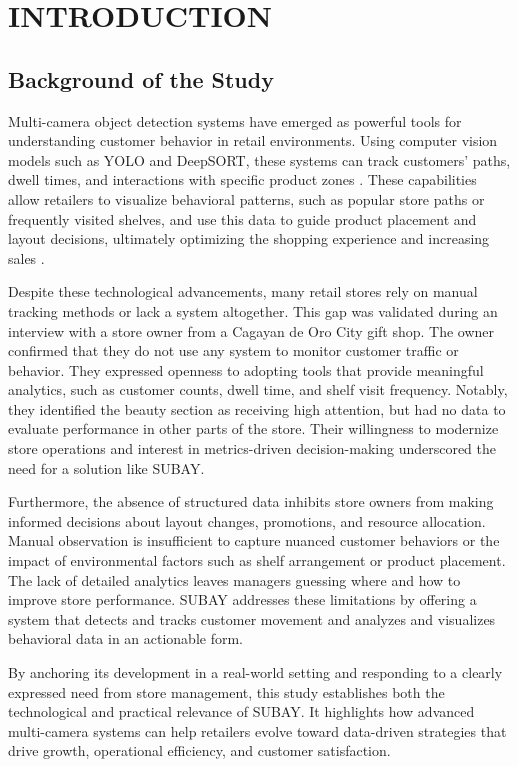 \chapter{INTRODUCTION}

{\baselineskip

\section{Background of the Study}

Multi-camera object detection systems have emerged as powerful tools for understanding customer behavior in retail environments. Using computer vision models such as YOLO and DeepSORT, these systems can track customers’ paths, dwell times, and interactions with specific product zones \citep{Erlina2023, Chen2022}. These capabilities allow retailers to visualize behavioral patterns, such as popular store paths or frequently visited shelves, and use this data to guide product placement and layout decisions, ultimately optimizing the shopping experience and increasing sales \citep{Cobos2019}.

Despite these technological advancements, many retail stores rely on manual tracking methods or lack a system altogether. This gap was validated during an interview with a store owner from a Cagayan de Oro City gift shop. The owner confirmed that they do not use any system to monitor customer traffic or behavior. They expressed openness to adopting tools that provide meaningful analytics, such as customer counts, dwell time, and shelf visit frequency. Notably, they identified the beauty section as receiving high attention, but had no data to evaluate performance in other parts of the store. Their willingness to modernize store operations and interest in metrics-driven decision-making underscored the need for a solution like SUBAY.


Furthermore, the absence of structured data inhibits store owners from making informed decisions about layout changes, promotions, and resource allocation. Manual observation is insufficient to capture nuanced customer behaviors or the impact of environmental factors such as shelf arrangement or product placement. The lack of detailed analytics leaves managers guessing where and how to improve store performance. SUBAY addresses these limitations by offering a system that detects and tracks customer movement and analyzes and visualizes behavioral data in an actionable form.

By anchoring its development in a real-world setting and responding to a clearly expressed need from store management, this study establishes both the technological and practical relevance of SUBAY. It highlights how advanced multi-camera systems can help retailers evolve toward data-driven strategies that drive growth, operational efficiency, and customer satisfaction.

}
